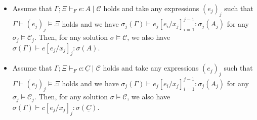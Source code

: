\documentclass{LMCS}
\newcommand{\C}{\underline{C}}
\newcommand{\ctx}{\Gamma}
\newcommand{\pctx}{\Xi}
\newcommand{\ent}[1][]{\vdash_{#1}}
\newcommand{\T}{\mathrel{:}}
\newcommand{\while}{\mid}
\newcommand{\cstr}{\mathcal{C}}
\newcommand{\sol}{\sigma}
\begin{document}
\begin{prop}[Soundness]
\label{prop:soundness}
\hfill
\begin{itemize}
\item
  Assume that $\ctx; \pctx \ent[F] e \T A \while \cstr$ holds and take
  any expressions $(e_j)_j$ such that
  $\ctx \ent (e_j)_j \models \pctx$ holds
  and we have $\sol_j(\ctx) \ent e_j[e_i / x_j]_{i = 1}^{j - 1} \T \sol_j(A_j)$
  for any $\sol_j \models \cstr_j$.
  Then, for any solution $\sol \models \cstr$,
  we also have $\sol(\ctx) \ent e[e_j / x_j]_j \T \sol(A)$.
\item
  Assume that $\ctx; \pctx \ent[F] c \T \C \while \cstr$ holds and take
  any expressions $(e_j)_j$ such that
  $\ctx \ent (e_j)_j \models \pctx$ holds
  and we have $\sol_j(\ctx) \ent e_j[e_i / x_j]_{i = 1}^{j - 1} \T \sol_j(A_j)$
  for any $\sol_j \models \cstr_j$.
  Then, for any solution $\sol \models \cstr$,
  we also have $\sol(\ctx) \ent c[e_j / x_j]_j \T \sol(\C)$.
\end{itemize}
\end{prop}
\end{document}
